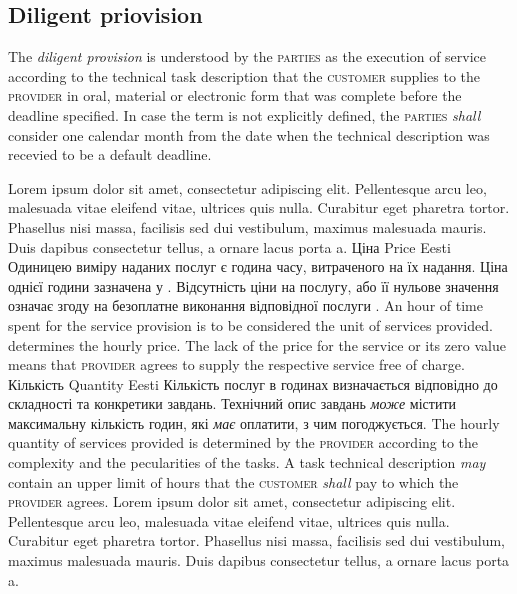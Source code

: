 \begin{Form}
\begin{paracol}{3}
{        \subsection{Diligent priovision}
        The \emph{diligent provision} is understood by the \textsc{parties} as the execution of service according to the technical task description that the \textsc{customer} supplies to the \textsc{provider} in oral, material or electronic form that was complete before the deadline specified. In case the term is not explicitly defined, the \textsc{parties} \emph{shall} consider one calendar month from the date when the technical description was recevied to be a default deadline.
        }
        {Lorem ipsum dolor sit amet, consectetur adipiscing elit. Pellentesque arcu leo, malesuada vitae eleifend vitae, ultrices quis nulla. Curabitur eget pharetra tortor. Phasellus nisi massa, facilisis sed dui vestibulum, maximus malesuada mauris. Duis dapibus consectetur tellus, a ornare lacus porta a.}
      \clause
        {Ціна}
        {Price}
        {Eesti}
        {Одиницею виміру наданих послуг є година часу, витраченого на їх надання. Ціна однієї години зазначена у . Відсутність ціни на послугу, або її нульове значення означає згоду на безоплатне виконання відповідної послуги .}
        {An hour of time spent for the service provision is to be considered the unit of services provided.  determines the hourly price. The lack of the price for the service or its zero value means that \textsc{provider} agrees to supply the respective service free of charge.}
        {}
      \clause
        {Кількість}
        {Quantity}
        {Eesti}
        {Кількість послуг в годинах визначається  відповідно до складності та конкретики завдань. Технічний опис завдань \emph{може} містити максимальну кількість годин, які  \emph{має} оплатити, з чим  погоджується.}
        {The hourly quantity of services provided is determined by the \textsc{provider} according to the complexity and the pecularities of the tasks. A task technical description \emph{may} contain an upper limit of hours that the \textsc{customer} \emph{shall} pay to which the \textsc{provider} agrees.}
        {Lorem ipsum dolor sit amet, consectetur adipiscing elit. Pellentesque arcu leo, malesuada vitae eleifend vitae, ultrices quis nulla. Curabitur eget pharetra tortor. Phasellus nisi massa, facilisis sed dui vestibulum, maximus malesuada mauris. Duis dapibus consectetur tellus, a ornare lacus porta a.}

\end{paracol}
\end{Form}
